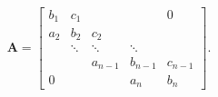 \[\mathbf{A}=\begin{bmatrix}b_{1}&c_{1}&&&0\\
a_{2}&b_{2}&c_{2}&&\\
&\ddots&\ddots&\ddots&\\
&&a_{n-1}&b_{n-1}&c_{n-1}\\
0&&&a_{n}&b_{n}\end{bmatrix}.\]